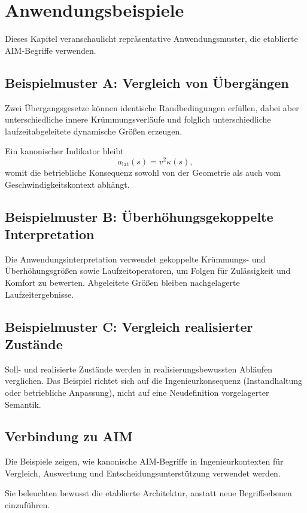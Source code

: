 \chapter{Anwendungsbeispiele}
\label{chap:applications-examples}

Dieses Kapitel veranschaulicht repräsentative Anwendungsmuster, die
etablierte AIM-Begriffe verwenden.

\section{Beispielmuster A: Vergleich von Übergängen}

Zwei Übergangsgesetze können identische Randbedingungen erfüllen, dabei
aber unterschiedliche innere Krümmungsverläufe und folglich
unterschiedliche laufzeitabgeleitete dynamische Größen erzeugen.

Ein kanonischer Indikator bleibt
\[
a_{\mathrm{lat}}(s)=v^2\kappa(s),
\]
womit die betriebliche Konsequenz sowohl von der Geometrie als auch vom
Geschwindigkeitskontext abhängt.

\section{Beispielmuster B: Überhöhungsgekoppelte Interpretation}

Die Anwendungsinterpretation verwendet gekoppelte Krümmungs- und
Überhöhungsgrößen sowie Laufzeitoperatoren, um Folgen für Zulässigkeit und
Komfort zu bewerten. Abgeleitete Größen bleiben nachgelagerte
Laufzeitergebnisse.

\section{Beispielmuster C: Vergleich realisierter Zustände}

Soll- und realisierte Zustände werden in realisierungsbewussten Abläufen
verglichen. Das Beispiel richtet sich auf die Ingenieurkonsequenz
(Instandhaltung oder betriebliche Anpassung), nicht auf eine Neudefinition
vorgelagerter Semantik.

\section{Verbindung zu AIM}
\begin{summary}
Die Beispiele zeigen, wie kanonische AIM-Begriffe in Ingenieurkontexten
für Vergleich, Auswertung und Entscheidungsunterstützung verwendet werden.

Sie beleuchten bewusst die etablierte Architektur, anstatt neue
Begriffsebenen einzuführen.
\end{summary}
